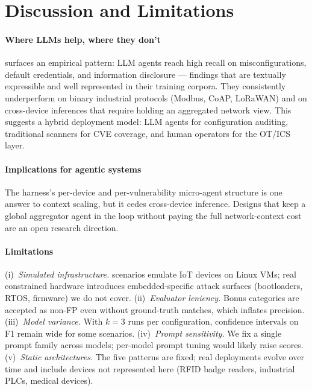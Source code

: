 
\section{Discussion and Limitations}
\label{sec:discussion}

\paragraph{Where LLMs help, where they don't}
\systemname{} surfaces an empirical pattern: LLM agents reach high recall on
misconfigurations, default credentials, and information disclosure — findings
that are textually expressible and well represented in their training corpora.
They consistently underperform on binary industrial protocols (Modbus, CoAP,
LoRaWAN) and on cross-device inferences that require holding an aggregated
network view. This suggests a hybrid deployment model: LLM agents for
configuration auditing, traditional scanners for CVE coverage, and human
operators for the OT/ICS layer.

\paragraph{Implications for agentic systems}
The harness's per-device and per-vulnerability micro-agent structure is one
answer to context scaling, but it cedes cross-device inference. Designs that
keep a global aggregator agent in the loop without paying the full
network-context cost are an open research direction.

\paragraph{Limitations}
(i)~\emph{Simulated infrastructure.} \systemname{} scenarios emulate IoT
devices on Linux VMs; real constrained hardware introduces embedded-specific
attack surfaces (bootloaders, RTOS, firmware) we do not cover.
(ii)~\emph{Evaluator leniency.} Bonus categories are accepted as non-FP even
without ground-truth matches, which inflates precision.
(iii)~\emph{Model variance.} With $k{=}3$ runs per configuration, confidence
intervals on F1 remain wide for some scenarios.
(iv)~\emph{Prompt sensitivity.} We fix a single prompt family across models;
per-model prompt tuning would likely raise scores.
(v)~\emph{Static architectures.} The five patterns are fixed; real deployments
evolve over time and include devices not represented here (RFID badge readers,
industrial PLCs, medical devices).
